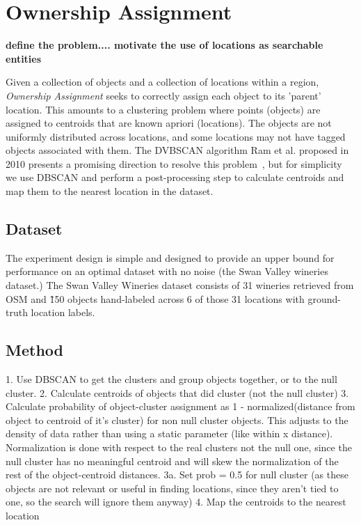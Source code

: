 \section{Ownership Assignment}
\label{section:ownership}

\textbf{define the problem.... motivate the use of locations as searchable entities}

Given a collection of objects and a collection of locations within a region, \emph{Ownership Assignment} seeks to correctly assign each object to its 'parent' location. This amounts to a clustering problem where points (objects) are assigned to centroids that are known apriori (locations). The objects are not uniformly distributed across locations, and some locations may not have tagged objects associated with them. The DVBSCAN algorithm Ram et al. proposed in 2010 presents a promising direction to resolve this problem~\cite{Ram2010}, but for simplicity we use DBSCAN and perform a post-processing step to calculate centroids and map them to the nearest location in the dataset. 



\subsection{Dataset}
The experiment design is simple and designed to provide an upper bound for performance on an optimal dataset with no noise (the Swan Valley wineries dataset.) 
The Swan Valley Wineries dataset consists of 31 wineries retrieved from OSM and \~150 objects hand-labeled across 6 of those 31 locations with ground-truth location labels.


\subsection{Method}
1. Use DBSCAN to get the clusters and group objects together, or to the null cluster.
2. Calculate centroids of objects that did cluster (not the null cluster)
3. Calculate probability of object-cluster assignment as 1 - normalized(distance from object to centroid of it's cluster) for non null cluster objects. This adjusts to the density of data rather than using a static parameter (like within x distance). Normalization is done with respect to the real clusters not the null one, since the null cluster has no meaningful centroid and will skew the normalization of the rest of the object-centroid distances.
3a. Set prob = 0.5 for null cluster (as these objects are not relevant or useful in finding locations, since they aren't tied to one, so the search will ignore them anyway)
4. Map the centroids to the nearest location


